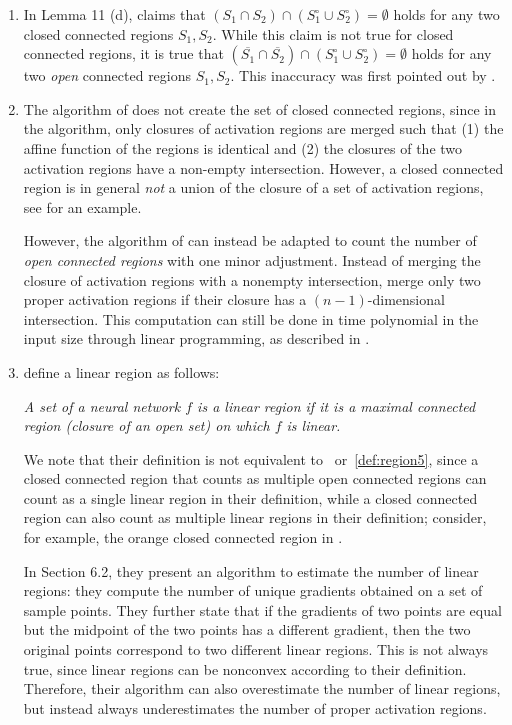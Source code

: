 \documentclass{article}
\begin{document}
\begin{enumerate}
    \item In Lemma 11 (d), \citep{chen2022improved} claims that $\left(S_1\cap S_2\right) \cap\left(S_1^\circ \cup S_2^\circ\right) = \emptyset$ holds for any two closed connected regions $S_1, S_2$. While this claim is not true for closed connected regions, it is true that $\left(\overline{S_1}\cap \overline{S_2}\right)\cap\left(S_1^\circ \cup S_2^\circ\right) = \emptyset$ holds for any two \emph{open} connected regions $S_1, S_2$. This inaccuracy was first pointed out by \citet{zanotti2025bounds}.
    
    \item The algorithm of \citet{wang2022estimation} does not create the set of closed connected regions, since in the algorithm, only closures of activation regions are merged such that (1) the affine function of the regions is identical and (2) the closures of the two activation regions have a non-empty intersection.
    However, a closed connected region is in general \emph{not} a union of the closure of a set of activation regions, see  for an example.
    
    However, the algorithm of \citet{wang2022estimation} can instead be adapted to count the number of \emph{open connected regions} with one minor adjustment. Instead of merging the closure of activation regions with a nonempty intersection, merge only two proper activation regions if their closure has a $(n-1)$-dimensional intersection. This computation can still be done in time polynomial in the input size through linear programming, as described in .

    \item \citet{lezeau2024tropical} define a linear region as follows:
    
    \textit{A set of a neural network $f$ is a linear region if it is a maximal connected region (closure of an open set) on which $f$ is linear.}

    We note that their definition is not equivalent to ~or~\ref{def:region5}, since a closed connected region that counts as multiple open connected regions can count as a single linear region in their definition, while a closed connected region can also count as multiple linear regions in their definition; consider, for example, the orange closed connected region in .

    In Section 6.2, they present an algorithm to estimate the number of linear regions: they compute the number of unique gradients obtained on a set of sample points. They further state that if the gradients of two points are equal but the midpoint of the two points has a different gradient, then the two original points correspond to two different linear regions.
    This is not always true, since linear regions can be nonconvex according to their definition. Therefore, their algorithm can also overestimate the number of linear regions, but instead always underestimates the number of proper activation regions.
\end{enumerate}
\end{document}
